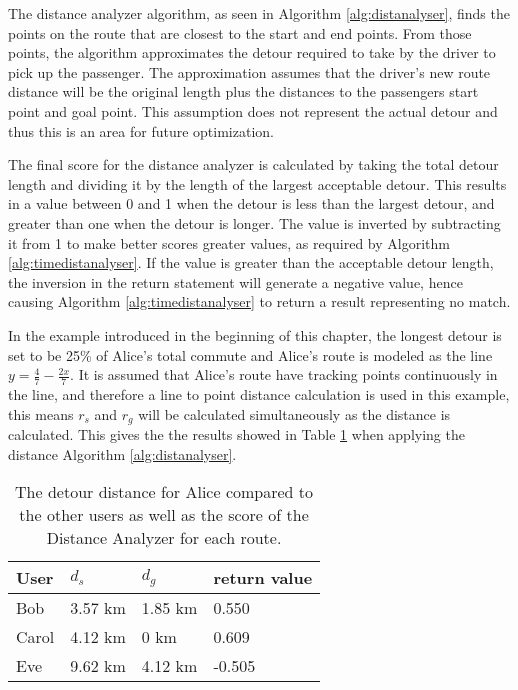 The distance analyzer algorithm, as seen in Algorithm \ref{alg:distanalyser}, finds the points on the route that are closest to the start and end points.
From those points, the algorithm approximates the detour required to take by the driver to pick up the passenger.
The approximation assumes that the driver's new route distance will be the original length plus the distances to the passengers start point and goal point.
This assumption does not represent the actual detour and thus this is an area for future optimization.

The final score for the distance analyzer is calculated by taking the total detour length and dividing it by the length of the largest acceptable detour.
This results in a value between 0 and 1 when the detour is less than the largest detour, and greater than one when the detour is longer.
The value is inverted by subtracting it from 1 to make better scores greater values, as required by Algorithm \ref{alg:timedistanalyser}.
If the value is greater than the acceptable detour length, the inversion in the return statement will generate a negative value, hence causing Algorithm \ref{alg:timedistanalyser} to return a result representing no match.

In the example introduced in the beginning of this chapter, the longest detour is set to be 25\% of Alice's total commute and Alice's route is modeled as the line  $y = \frac{4}{7}-\frac{2 x}{7}$.
It is assumed that Alice's route have tracking points continuously in the line, and therefore a line to point distance calculation is used in this example, this means $r_s$ and $r_g$ will be calculated simultaneously as the distance is calculated.
This gives the the results showed in Table \ref{tbl:distance} when applying the distance  Algorithm \ref{alg:distanalyser}.

\begin{table}[!ht]
\centering
\begin{tabular}{@{}llll@{}}
\toprule
\textbf{User} 	& \textbf{$d_s$} & \textbf{$d_g$} 	& \textbf{return value} 	\\ \midrule
Bob         	& 3.57 km        & 1.85 km	    	& 0.550		 			\\
Carol         	& 4.12 km        & 0 km       		& 0.609        		\\
Eve           	& 9.62 km        & 4.12 km		    & -0.505        		\\ \bottomrule
\end{tabular}
\caption{The detour distance for Alice compared to the other users as well as the score of the Distance Analyzer for each route.}
\label{tbl:distance}
\end{table}

